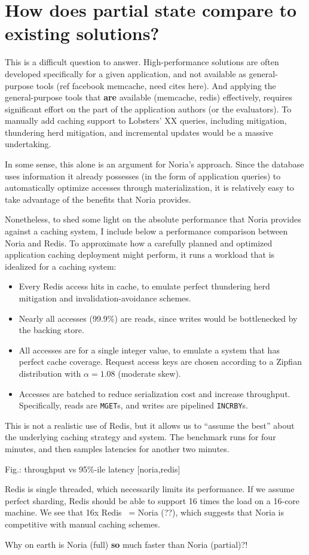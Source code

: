 \section{How does partial state compare to existing solutions?}
\label{s:eval:existing}

This is a difficult question to answer. High-performance solutions are
often developed specifically for a given application, and not available
as general-purpose tools (ref facebook memcache, need cites here).
And applying the general-purpose tools that \textbf{are} available (memcache,
redis) effectively, requires significant effort on the part of the
application authors (or the evaluators). To manually add caching support
to Lobsters' XX queries, including mitigation, thundering herd
mitigation, and incremental updates would be a massive undertaking.

In some sense, this alone is an argument for Noria's approach. Since the
database uses information it already possesses (in the form of
application queries) to automatically optimize accesses through
materialization, it is relatively easy to take advantage of the benefits
that Noria provides.

Nonetheless, to shed some light on the absolute performance that Noria
provides against a caching system, I include below a performance
comparison between Noria and Redis. To approximate how a carefully
planned and optimized application caching deployment might perform, it
runs a workload that is idealized for a caching system:

\begin{itemize}
 \item Every Redis access hits in cache, to emulate perfect thundering herd
   mitigation and invalidation-avoidance schemes.
 \item Nearly all accesses (99.9\%) are reads, since writes would be
   bottlenecked by the backing store.
 \item All accesses are for a single integer value, to emulate a system that has
   perfect cache coverage. Request access keys are chosen according to a Zipfian
    distribution with $\alpha = 1.08$ (moderate skew).
 \item Accesses are batched to reduce serialization cost and increase
   throughput. Specifically, reads are \texttt{MGET}s, and writes are pipelined
    \texttt{INCRBY}s.
\end{itemize}

This is not a realistic use of Redis, but it allows us to ``assume the best''
about the underlying caching strategy and system. The benchmark runs for four
minutes, and then samples latencies for another two minutes.

Fig.: throughput vs 95\%-ile latency [noria,redis]

Redis is single threaded, which necessarily limits its performance. If we assume
perfect sharding, Redis should be able to support 16 times the load on a 16-core
machine. We see that 16x Redis ~= Noria (??), which suggests that Noria is
competitive with manual caching schemes.

\begin{inprogress}
Why on earth is Noria (full) \textbf{so} much faster than Noria (partial)?!
\end{inprogress}
